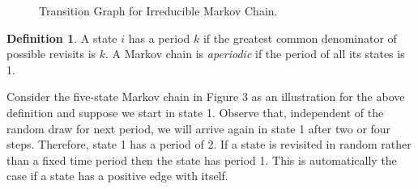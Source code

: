 \documentclass[12pt,english,a4paper,oneside]{article}
\theoremstyle{definition}
\newtheorem{definition}{Definition}[section]
\theoremstyle{definition}
\theoremstyle{definition}
\theoremstyle{definition}
\theoremstyle{remark}
\begin{document}
\begin{figure}[H]
\label{fig:ex2}
\centering


\caption{Transition Graph for Irreducible Markov Chain.}

\end{figure}

\begin{definition}
A state $i$ has a period $k$ if the greatest common denominator of possible revisits is $k$. A Markov chain is \textit{aperiodic} if the period of all its states is 1.
\end{definition}

\noindent
Consider the five-state Markov chain in Figure 3 as an illustration for the above definition and suppose we start in state 1. Observe that, independent of the random draw for next period, we will arrive again in state 1 after two or four steps. Therefore, state 1 has a period of 2. If a state is revisited in random rather than a fixed time period then the state has period 1. This is automatically the case if a state has a positive edge with itself.
\end{document}
